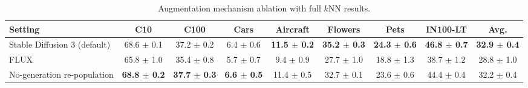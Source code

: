 \begin{table}[H]
\centering
\scriptsize
\setlength{\tabcolsep}{3.5pt}
\caption{Augmentation mechanism ablation with full $k$NN results.}
\label{tab:app_generation_knn}
\begin{adjustbox}{width=\textwidth}
\begin{tabular}{l c c c c c c c c}
\toprule
Setting & C10 & C100 & Cars & Aircraft & Flowers & Pets & IN100-LT & Avg. \\
\midrule
Stable Diffusion 3 (default) & 68.6 {\scriptsize$\pm$ 0.1} & 37.2 {\scriptsize$\pm$ 0.2} & 6.4 {\scriptsize$\pm$ 0.6} & \textbf{11.5 {\scriptsize$\pm$ 0.2}} & \textbf{35.2 {\scriptsize$\pm$ 0.3}} & \textbf{24.3 {\scriptsize$\pm$ 0.6}} & \textbf{46.8 {\scriptsize$\pm$ 0.7}} & \textbf{32.9 {\scriptsize$\pm$ 0.4}} \\
FLUX & 65.8 {\scriptsize$\pm$ 1.0} & 35.4 {\scriptsize$\pm$ 0.8} & 5.7 {\scriptsize$\pm$ 0.7} & 9.4 {\scriptsize$\pm$ 0.9} & 27.7 {\scriptsize$\pm$ 1.0} & 18.8 {\scriptsize$\pm$ 1.3} & 38.7 {\scriptsize$\pm$ 1.2} & 28.8 {\scriptsize$\pm$ 1.0} \\
No-generation re-population & \textbf{68.8 {\scriptsize$\pm$ 0.2}} & \textbf{37.7 {\scriptsize$\pm$ 0.3}} & \textbf{6.6 {\scriptsize$\pm$ 0.5}} & 11.4 {\scriptsize$\pm$ 0.5} & 32.7 {\scriptsize$\pm$ 0.1} & 23.6 {\scriptsize$\pm$ 0.6} & 44.4 {\scriptsize$\pm$ 0.4} & 32.2 {\scriptsize$\pm$ 0.4} \\
\bottomrule
\end{tabular}
\end{adjustbox}
\end{table}
